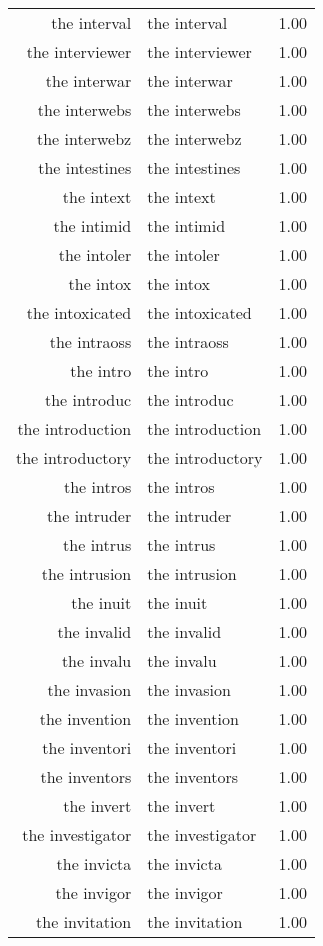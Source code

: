 \begin{table}[ht]
\begin{tabular}{rlr}
  the interval & the interval & 1.00 \\ 
  the interviewer & the interviewer & 1.00 \\ 
  the interwar & the interwar & 1.00 \\ 
  the interwebs & the interwebs & 1.00 \\ 
  the interwebz & the interwebz & 1.00 \\ 
  the intestines & the intestines & 1.00 \\ 
  the intext & the intext & 1.00 \\ 
  the intimid & the intimid & 1.00 \\ 
  the intoler & the intoler & 1.00 \\ 
  the intox & the intox & 1.00 \\ 
  the intoxicated & the intoxicated & 1.00 \\ 
  the intraoss & the intraoss & 1.00 \\ 
  the intro & the intro & 1.00 \\ 
  the introduc & the introduc & 1.00 \\ 
  the introduction & the introduction & 1.00 \\ 
  the introductory & the introductory & 1.00 \\ 
  the intros & the intros & 1.00 \\ 
  the intruder & the intruder & 1.00 \\ 
  the intrus & the intrus & 1.00 \\ 
  the intrusion & the intrusion & 1.00 \\ 
  the inuit & the inuit & 1.00 \\ 
  the invalid & the invalid & 1.00 \\ 
  the invalu & the invalu & 1.00 \\ 
  the invasion & the invasion & 1.00 \\ 
  the invention & the invention & 1.00 \\ 
  the inventori & the inventori & 1.00 \\ 
  the inventors & the inventors & 1.00 \\ 
  the invert & the invert & 1.00 \\ 
  the investigator & the investigator & 1.00 \\ 
  the invicta & the invicta & 1.00 \\ 
  the invigor & the invigor & 1.00 \\ 
  the invitation & the invitation & 1.00 \\ 

\end{tabular}
\end{table}

